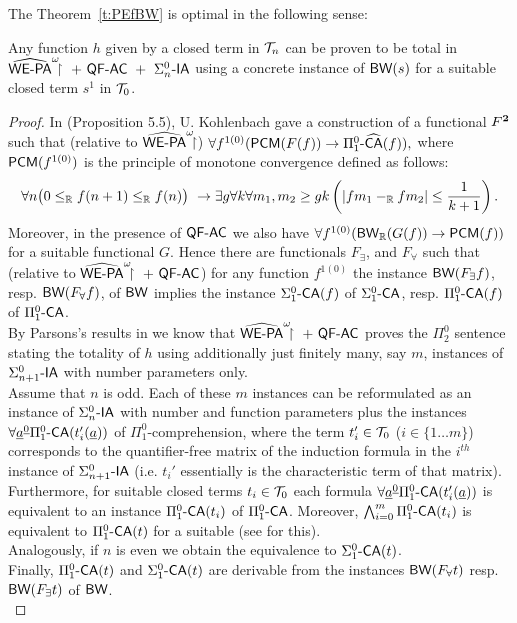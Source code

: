 The Theorem~\ref{t:PEfBW} is optimal in the following sense:
%
\begin{prop}\label{p:optPEfBW}
Any function $h$ given by a closed term in $\mathcal{T}_n$ can be proven to be total
in $\hrrwepa\ +\ \QFm\AC\ +\ \Sigma^0_n\usftext{-IA}$ using a concrete 
instance of
$\textsf{\upshape BW}(s)$ for a suitable closed term $s^1$ in $\mathcal{T}_0$.
\end{prop}
\begin{proof}

In \cite{Kohlenbach00} (Proposition 5.5), U. Kohlenbach gave a 
construction of a
functional $F^\mathbf{2}$ such that 
(relative to $\widehat{\textsf{\upshape WE-PA}}^\omega\!\!\!\restriction$) $\forall 
f^{1(0)}(\textsf{\upshape PCM}(F(f))\rightarrow\Pi^0_1\textsf{\upshape -}\widehat{\textsf{\upshape CA}}(f)),$ 
where $\textsf{\upshape PCM}(f^{1(0)})$ is the principle of 
monotone convergence defined as follows:
\[
\forall n\big(0\leq_{\mathbb{R}} f(n+1)\leq_{\mathbb{R}} f(n)\big)\ \rightarrow 
       \exists g\forall k\forall m_1,m_2\geq gk
\left(|fm_1-_{\mathbb{R}} fm_2|\leq\frac{1}{k+1}\right)
\text{.}
\]
 Moreover, in the presence of $\textsf{\upshape QF-}\textsf{\upshape AC}$
we also have $\forall f^{1(0)}( \textsf{\upshape BW}_{\mathbb{R}}(G(f)) \rightarrow\textsf{\upshape PCM}(f) )$ for a 
suitable functional $G.$ 
Hence there are functionals $F_\exists$, and $F_\forall$ such that 
(relative to $\hrrwepa\ +\ \QFm\AC$) for any
function $f^{1(0)}$ the instance $\textsf{\upshape BW}(F_\exists f)$, resp. $\textsf{\upshape BW}(F_\forall f)$, 
of $\textsf{\upshape BW}$ implies the instance $\Sigma^0_1\textsf{\upshape -}\textsf{\upshape CA}(f)$ of $\Sigma^0_1\textsf{\upshape -}\textsf{\upshape CA}$, 
resp. $\Pi^0_1\textsf{\upshape -}\textsf{\upshape CA}(f)$ of $\Pi^0_1\textsf{\upshape -}\textsf{\upshape CA}$.\\ 
By Parsons's results in \cite{Parsons72} we know that
$\hrrwepa\ +\ \QFm\AC$ proves the $\Pi^0_2$ sentence stating
the totality of $h$ using additionally just finitely many, say $m$, instances
of $\Sigma^0_{n+1}\textsf{\upshape -IA}$ with number parameters only.\\
%
Assume that $n$ is odd. Each of these $m$ instances
can be reformulated 
as an instance of $\Sigma^0_{n}\textsf{\upshape -IA}$ with number and 
function parameters plus the instances 
$\forall \underline a^{\underline0} \Pi^0_1\textsf{\upshape -}\textsf{\upshape CA}(t_i'(\underline a))$ of $\Pi^0_1$-comprehension, 
where the term $t_i'\in\mathcal{T}_0$ ($i\in\{1\ldots m\}$) corresponds to the 
quantifier-free matrix of the induction formula in the $i^{th}$ instance of 
$\Sigma^0_{n+1}\textsf{\upshape -IA}$ (i.e. $t_i'$ essentially is the characteristic 
term of that matrix). 
Furthermore, for suitable closed terms $t_i\in\mathcal{T}_0$
 each formula $\forall \underline a^{\underline0} \Pi^0_1\textsf{\upshape -}\textsf{\upshape CA}(t_i'(\underline a))$ is
equivalent to an instance $\Pi^0_1\textsf{\upshape -}\textsf{\upshape CA}(t_i)$ of $\Pi^0_1\textsf{\upshape -}\textsf{\upshape CA}$.
Moreover, $\bigwedge^{m}_{i=0} \Pi^0_1\textsf{\upshape -}\textsf{\upshape CA}(t_i)$ is 
equivalent to $\Pi^0_1\textsf{\upshape -}\textsf{\upshape CA}(t)$ for a suitable \tsn (see \cite{Kohlenbach1998} for 
this).\\
Analogously, if $n$ is even we obtain the equivalence to $\Sigma^0_1\textsf{\upshape -}\textsf{\upshape CA}(t)$.\\
Finally, $\Pi^0_1\textsf{\upshape -}\textsf{\upshape CA}(t)$ and $\Sigma^0_1\textsf{\upshape -}\textsf{\upshape CA}(t)$ are
derivable from the instances $\textsf{\upshape BW}(F_\forall t)$ resp. $\textsf{\upshape BW}(F_\exists t)$ of 
$\textsf{\upshape BW}$.\\
\end{proof} 


